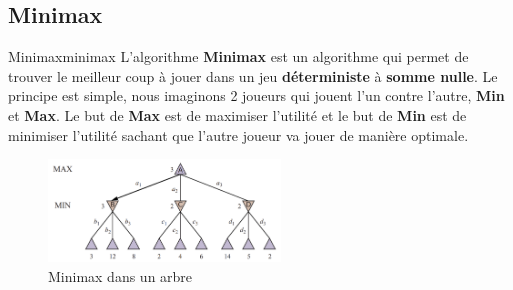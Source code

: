 \subsection{Minimax} %
\label{sub:minimax}

\begin{definition}{Minimax}{minimax}
    L'algorithme \textbf{Minimax} est un algorithme qui permet de trouver le meilleur coup à jouer dans un jeu \textbf{déterministe} à \textbf{somme nulle}.
    Le principe est simple, nous imaginons 2 joueurs qui jouent l'un contre l'autre, \textbf{Min} et \textbf{Max}.
    Le but de \textbf{Max} est de maximiser l'utilité et le but de \textbf{Min} est de minimiser l'utilité sachant 
    que l'autre joueur va jouer de manière optimale.
\end{definition}

\begin{figure}[H]
    \begin{center}
        \includegraphics[width=0.55\textwidth]{./pictures/minimax.png}
    \end{center}
    \caption{Minimax dans un arbre}\label{fig:minimaxtree}
\end{figure}

